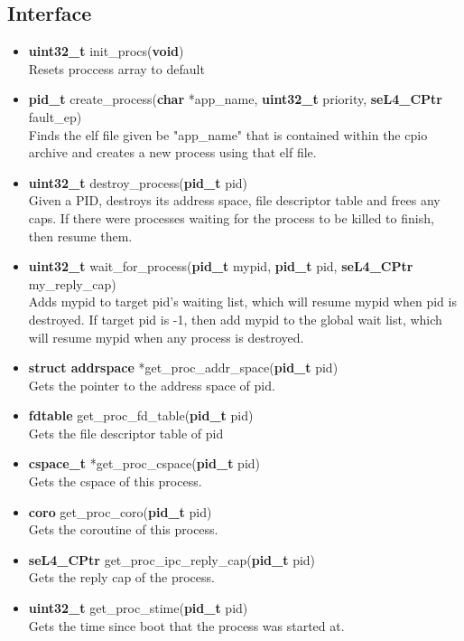 \documentclass[12pt]{article}
\begin{document}
\subsection{Interface}
\begin{itemize}
\item \textbf{uint32\_t} init\_procs(\textbf{void})\\
Resets proccess array to default
\item \textbf{pid\_t} create\_process(\textbf{char} *app\_name, \textbf{uint32\_t} priority, \textbf{seL4\_CPtr} fault\_ep)\\
Finds the elf file given be "app\_name" that is contained within the cpio archive and creates a new process using that elf file.
\item \textbf{uint32\_t} destroy\_process(\textbf{pid\_t} pid)\\
Given a PID, destroys its address space, file descriptor table and frees any caps. If there were processes waiting for the process to be killed to finish, then resume them.
\item \textbf{uint32\_t} wait\_for\_process(\textbf{pid\_t} mypid, \textbf{pid\_t} pid, \textbf{seL4\_CPtr} my\_reply\_cap)\\
Adds mypid to target pid's waiting list, which will resume mypid when pid is destroyed. If target pid is -1, then add mypid to the global wait list, which will resume mypid when any process is destroyed.
\item \textbf{struct addrspace} *get\_proc\_addr\_space(\textbf{pid\_t} pid)\\
Gets the pointer to the address space of pid.
\item \textbf{fdtable} get\_proc\_fd\_table(\textbf{pid\_t} pid)\\
Gets the file descriptor table of pid
\item \textbf{cspace\_t} *get\_proc\_cspace(\textbf{pid\_t} pid)\\
Gets the cspace of this process.
\item \textbf{coro} get\_proc\_coro(\textbf{pid\_t} pid)\\
Gets the coroutine of this process.
\item \textbf{seL4\_CPtr} get\_proc\_ipc\_reply\_cap(\textbf{pid\_t} pid)\\
Gets the reply cap of the process.
\item \textbf{uint32\_t} get\_proc\_stime(\textbf{pid\_t} pid)\\
Gets the time since boot that the process was started at.

\end{itemize}
\end{document}
